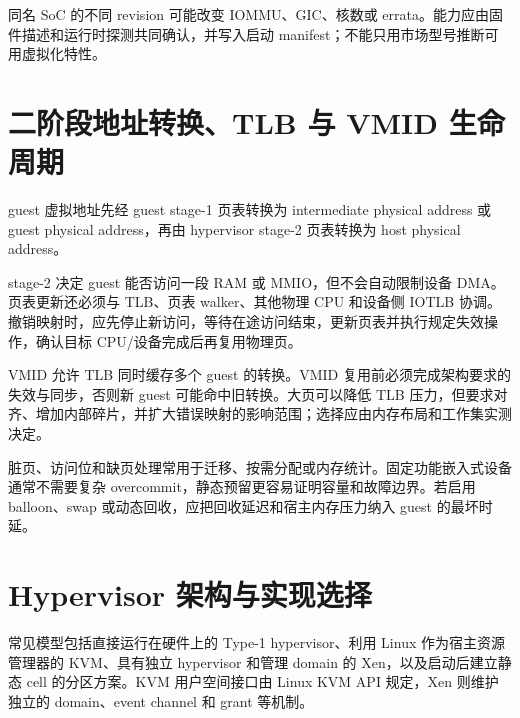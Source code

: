 同名 SoC 的不同 revision 可能改变 IOMMU、GIC、核数或 errata。能力应由固件描述和运行时探测共同确认，并写入启动 manifest；不能只用市场型号推断可用虚拟化特性。

\section{二阶段地址转换、TLB 与 VMID 生命周期}

guest 虚拟地址先经 guest stage-1 页表转换为 intermediate physical address 或 guest physical address，再由 hypervisor stage-2 页表转换为 host physical address。

\begin{center}
\end{center}

stage-2 决定 guest 能否访问一段 RAM 或 MMIO，但不会自动限制设备 DMA。页表更新还必须与 TLB、页表 walker、其他物理 CPU 和设备侧 IOTLB 协调。撤销映射时，应先停止新访问，等待在途访问结束，更新页表并执行规定失效操作，确认目标 CPU/设备完成后再复用物理页。

VMID 允许 TLB 同时缓存多个 guest 的转换。VMID 复用前必须完成架构要求的失效与同步，否则新 guest 可能命中旧转换。大页可以降低 TLB 压力，但要求对齐、增加内部碎片，并扩大错误映射的影响范围；选择应由内存布局和工作集实测决定。

脏页、访问位和缺页处理常用于迁移、按需分配或内存统计。固定功能嵌入式设备通常不需要复杂 overcommit，静态预留更容易证明容量和故障边界。若启用 balloon、swap 或动态回收，应把回收延迟和宿主内存压力纳入 guest 的最坏时延。

\section{Hypervisor 架构与实现选择}

常见模型包括直接运行在硬件上的 Type-1 hypervisor、利用 Linux 作为宿主资源管理器的 KVM、具有独立 hypervisor 和管理 domain 的 Xen，以及启动后建立静态 cell 的分区方案。KVM 用户空间接口由 Linux KVM API 规定，Xen 则维护独立的 domain、event channel 和 grant 等机制\cite{linux-kvm-api,xen-doc}。

